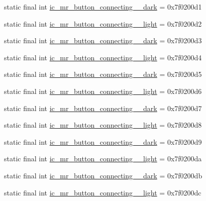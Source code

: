 \begin{CompactItemize}
\item 
static final int \hyperlink{classandroid_1_1support_1_1v7_1_1cardview_1_1_r_1_1drawable_f910de64cfd7210c6c43860529f9df7a}{ic\_\-mr\_\-button\_\-connecting\_\_\-dark} = 0x7f0200d1
\item 
static final int \hyperlink{classandroid_1_1support_1_1v7_1_1cardview_1_1_r_1_1drawable_004923fd740ee4bf4327a0da72c4dcaa}{ic\_\-mr\_\-button\_\-connecting\_\_\-light} = 0x7f0200d2
\item 
static final int \hyperlink{classandroid_1_1support_1_1v7_1_1cardview_1_1_r_1_1drawable_8f93615a68db5da6c86e415ac4257b2e}{ic\_\-mr\_\-button\_\-connecting\_\_\-dark} = 0x7f0200d3
\item 
static final int \hyperlink{classandroid_1_1support_1_1v7_1_1cardview_1_1_r_1_1drawable_e220ba0f1f09199c9f477d18a256c96c}{ic\_\-mr\_\-button\_\-connecting\_\_\-light} = 0x7f0200d4
\item 
static final int \hyperlink{classandroid_1_1support_1_1v7_1_1cardview_1_1_r_1_1drawable_2ae918d05406b824818892ff66b94bbb}{ic\_\-mr\_\-button\_\-connecting\_\_\-dark} = 0x7f0200d5
\item 
static final int \hyperlink{classandroid_1_1support_1_1v7_1_1cardview_1_1_r_1_1drawable_d7d7c313e5e082660b88e36f91a394aa}{ic\_\-mr\_\-button\_\-connecting\_\_\-light} = 0x7f0200d6
\item 
static final int \hyperlink{classandroid_1_1support_1_1v7_1_1cardview_1_1_r_1_1drawable_39026215cae16a095e1cc59af25fea47}{ic\_\-mr\_\-button\_\-connecting\_\_\-dark} = 0x7f0200d7
\item 
static final int \hyperlink{classandroid_1_1support_1_1v7_1_1cardview_1_1_r_1_1drawable_cc6b0951dd0cb49e1a5dff388772b325}{ic\_\-mr\_\-button\_\-connecting\_\_\-light} = 0x7f0200d8
\item 
static final int \hyperlink{classandroid_1_1support_1_1v7_1_1cardview_1_1_r_1_1drawable_5fa79e5ad76bdde8e972882d9cdb90cf}{ic\_\-mr\_\-button\_\-connecting\_\_\-dark} = 0x7f0200d9
\item 
static final int \hyperlink{classandroid_1_1support_1_1v7_1_1cardview_1_1_r_1_1drawable_18fe16cfe9c056bf9ea8d6f100bbaee3}{ic\_\-mr\_\-button\_\-connecting\_\_\-light} = 0x7f0200da
\item 
static final int \hyperlink{classandroid_1_1support_1_1v7_1_1cardview_1_1_r_1_1drawable_fcdaa29c3216c6e31105449fecb2c9ed}{ic\_\-mr\_\-button\_\-connecting\_\_\-dark} = 0x7f0200db
\item 
static final int \hyperlink{classandroid_1_1support_1_1v7_1_1cardview_1_1_r_1_1drawable_01cb9dd80bbac91e0f21bf23bdd5d52e}{ic\_\-mr\_\-button\_\-connecting\_\_\-light} = 0x7f0200dc

\end{CompactItemize}
